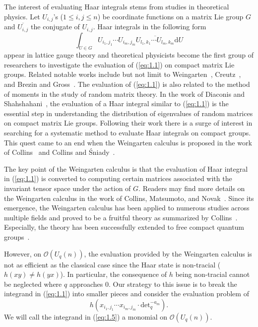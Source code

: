 \documentclass[table,a4paper,reqno]{amsart}
\numberwithin{equation}{section}
\theoremstyle{definition}
\begin{document}
The interest of evaluating Haar integrals stems from studies in theoretical physics. Let $U_{i,j}$'s ($1\le i,j\le n$) be coordinate functions on a matrix Lie group $G$ and $\overline{U_{i,j}}$ the conjugate of $U_{i,j}$. Haar integrals in the following form 
\begin{equation}\label{eq:1.1}
    \int_{U\in G}U_{i_1,j_1}\cdots U_{i_m,j_m}\overline{U_{l_1,k_1}\cdots U_{l_m,k_m}}\text{d}U
\end{equation}
appear in lattice gauge theory and theoretical physicists become the first group of researchers to investigate the evaluation of (\ref{eq:1.1}) on compact matrix Lie groups. Related notable works include but not limit to Weingarten~\cite{weingarten1978asymptotic}, Creutz~\cite{creutz1978invariant}, and Brezin and Gross~\cite{brezin1980external}. The evaluation of (\ref{eq:1.1}) is also related to the method of moments in the study of random matrix theory. In the work of Diaconis and Shahshahani~\cite{diaconis1994eigenvalues}, the evaluation of a Haar integral similar to (\ref{eq:1.1}) is the essential step in understanding the distribution of eigenvalues of random matrices on compact matrix Lie groups. Following their work there is a surge of interest in searching for a systematic method to evaluate Haar integrals on compact groups. This quest came to an end when the Weingarten calculus is proposed in the work of Collins~\cite{collins2003moments} and Collins and {\'S}niady~\cite{collins2006integration}. 

The key point of the Weingarten calculus is that the evaluation of Haar integral in (\ref{eq:1.1}) is converted to computing certain matrices associated with the invariant tensor space under the action of $G$. Readers may find more details on the Weingarten calculus in the work of Collins, Matsumoto, and Novak~\cite{collins2022weingarten}. Since its emergence, the Weingarten calculus has been applied to numerous studies across multiple fields and proved to be a fruitful theory as summarized by Collins~\cite{collins2022moment}. Especially, the theory has been successfully extended to free compact quantum groups~\cite{wang1995free,banica2007integration,banica2007permutationintegration,banica2008integration}. 

However, on $\mathcal{O}(U_q(n))$, the evaluation provided by the Weingarten calculus is not as efficient as the classical case since the Haar state is non-tracial ($h(xy)\ne h(yx)$). In particular, the consequence of $h$ being non-tracial cannot be neglected where $q$ approaches $0$. Our strategy to this issue is to break the integrand in (\ref{eq:1.1}) into smaller pieces and consider the evaluation problem of
\begin{equation}\label{eq:1.5}
    h(x_{i_1,j_1}\cdots x_{i_m,j_m}\cdot \text{det}_q^{-a_m}).
\end{equation}
We will call the integrand in (\ref{eq:1.5}) a monomial on $\mathcal{O}(U_q(n))$. 
\end{document}
